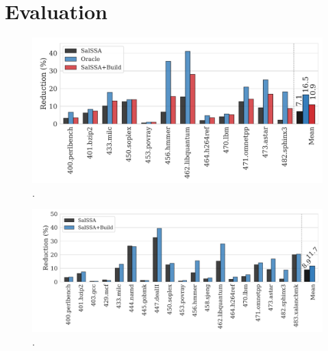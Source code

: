\section{Evaluation}


\begin{figure}[h]
  \centering
  \includegraphics[width=\textwidth]{figs/code-size-oracle-vs-partial.pdf}
  \vspace{-2.5em}
  \caption{.}
  \label{fig:code-size-oracle-vs-partial}
\end{figure}


\begin{figure}[h]
  \centering
  \includegraphics[width=\textwidth]{figs/code-size-partial.pdf}
  \vspace{-2.5em}
  \caption{.}
  \label{fig:code-size-partial}
\end{figure}

